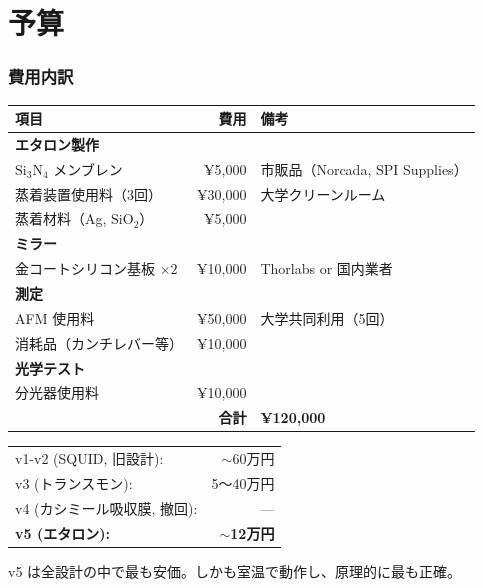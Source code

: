 \documentclass[12pt,a4paper]{article}
\begin{document}
\part{予算}

\section{費用内訳}

\begin{center}
\renewcommand{\arraystretch}{1.3}
\begin{tabular}{lrl}
\toprule
項目 & 費用 & 備考 \\
\midrule
\multicolumn{3}{l}{\textbf{エタロン製作}} \\
$\text{Si}_3\text{N}_4$ メンブレン & ¥5,000 & 市販品（Norcada, SPI Supplies） \\
蒸着装置使用料（3回） & ¥30,000 & 大学クリーンルーム \\
蒸着材料（Ag, $\text{SiO}_2$） & ¥5,000 & \\
\midrule
\multicolumn{3}{l}{\textbf{ミラー}} \\
金コートシリコン基板 $\times 2$ & ¥10,000 & Thorlabs or 国内業者 \\
\midrule
\multicolumn{3}{l}{\textbf{測定}} \\
AFM 使用料 & ¥50,000 & 大学共同利用（5回） \\
消耗品（カンチレバー等） & ¥10,000 & \\
\midrule
\multicolumn{3}{l}{\textbf{光学テスト}} \\
分光器使用料 & ¥10,000 & \\
\midrule
\multicolumn{2}{r}{\textbf{合計}} & \textbf{¥120,000} \\
\bottomrule
\end{tabular}
\end{center}

\begin{honestbox}[コストの比較]
\begin{center}
\begin{tabular}{lr}
v1-v2 (SQUID, 旧設計): & $\sim$60万円 \\
v3 (トランスモン): & 5〜40万円 \\
v4 (カシミール吸収膜, 撤回): & --- \\
\textbf{v5 (エタロン):} & \textbf{$\sim$12万円} \\
\end{tabular}
\end{center}

v5 は全設計の中で最も安価。しかも室温で動作し、原理的に最も正確。
\end{honestbox}
\end{document}
